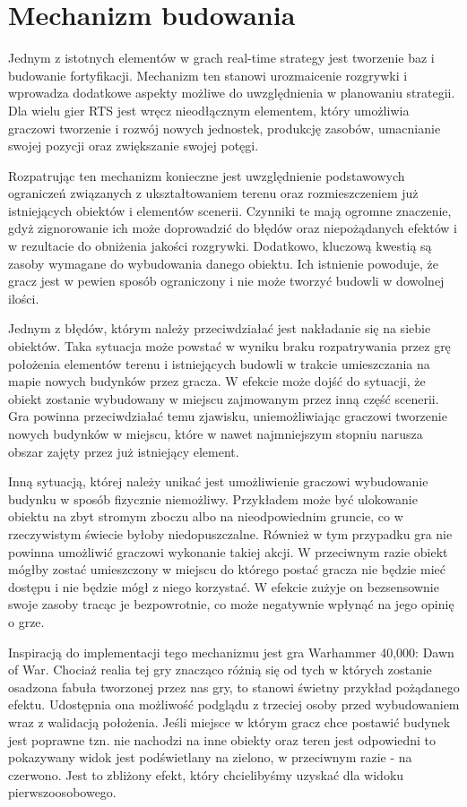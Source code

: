 \section{Mechanizm budowania}\label{chap:build}
Jednym z istotnych elementów w grach real-time strategy jest tworzenie baz i budowanie fortyfikacji. Mechanizm ten stanowi urozmaicenie rozgrywki i wprowadza dodatkowe aspekty możliwe do uwzględnienia w planowaniu strategii. Dla wielu gier RTS jest wręcz nieodłącznym elementem, który umożliwia graczowi tworzenie i rozwój nowych jednostek, produkcję zasobów, umacnianie swojej pozycji oraz zwiększanie swojej potęgi.

Rozpatrując ten mechanizm konieczne jest uwzględnienie podstawowych ograniczeń związanych z ukształtowaniem terenu oraz rozmieszczeniem już istniejących obiektów i elementów scenerii. Czynniki te mają ogromne znaczenie, gdyż zignorowanie ich może doprowadzić do błędów oraz niepożądanych efektów i w rezultacie do obniżenia jakości rozgrywki. Dodatkowo, kluczową kwestią są zasoby wymagane do wybudowania danego obiektu. Ich istnienie powoduje, że gracz jest w pewien sposób ograniczony i nie może tworzyć budowli w dowolnej ilości.

Jednym z błędów, którym należy przeciwdziałać jest nakładanie się na siebie obiektów. Taka sytuacja może powstać w wyniku braku rozpatrywania przez grę położenia elementów terenu i istniejących budowli w trakcie umieszczania na mapie nowych budynków przez gracza. W efekcie może dojść do sytuacji, że obiekt zostanie wybudowany w miejscu zajmowanym przez inną część scenerii. Gra powinna przeciwdziałać temu zjawisku, uniemożliwiając graczowi tworzenie nowych budynków w miejscu, które w nawet najmniejszym stopniu narusza obszar zajęty przez już istniejący element.

Inną sytuacją, której należy unikać jest umożliwienie graczowi wybudowanie budynku w sposób fizycznie niemożliwy. Przykładem może być ulokowanie obiektu na zbyt stromym zboczu albo na nieodpowiednim gruncie, co w rzeczywistym świecie byłoby niedopuszczalne. Również w tym przypadku gra nie powinna umożliwić graczowi wykonanie takiej akcji. W przeciwnym razie obiekt mógłby zostać umieszczony w miejscu do którego postać gracza nie będzie mieć dostępu i nie będzie mógł z niego korzystać. W efekcie zużyje on bezsensownie swoje zasoby tracąc je bezpowrotnie, co może negatywnie wpłynąć na jego opinię o grze.

Inspiracją do implementacji tego mechanizmu jest gra Warhammer 40,000: Dawn of War. Chociaż realia tej gry znacząco różnią się od tych w których zostanie osadzona fabuła tworzonej przez nas gry, to stanowi świetny przykład pożądanego efektu. Udostępnia ona możliwość podglądu z trzeciej osoby przed wybudowaniem wraz z walidacją położenia. Jeśli miejsce w którym gracz chce postawić budynek jest poprawne tzn. nie nachodzi na inne obiekty oraz teren jest odpowiedni to pokazywany widok jest podświetlany na zielono, w przeciwnym razie - na czerwono. Jest to zbliżony efekt, który chcielibyśmy uzyskać dla widoku pierwszoosobowego.

